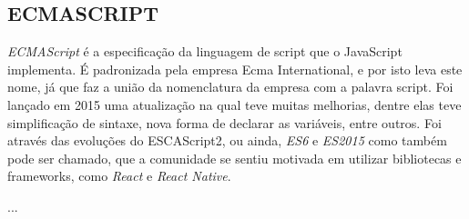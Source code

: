\subsection{ECMASCRIPT}

\textit{ECMAScript} é a especificação da linguagem de script que o JavaScript implementa. É padronizada pela empresa Ecma International, e por isto leva este nome, já que faz a união da nomenclatura da empresa com a palavra script. Foi lançado em 2015 uma atualização na qual teve muitas melhorias, dentre elas teve simplificação de sintaxe, nova forma de declarar as variáveis, entre outros. \cite{ecma}
Foi através das evoluções do ESCAScript2, ou ainda, \textit{ES6} e \textit{ES2015} como também pode ser chamado, que a comunidade se sentiu motivada em utilizar bibliotecas e frameworks, como \textit{React} e \textit{React Native}. 

...


